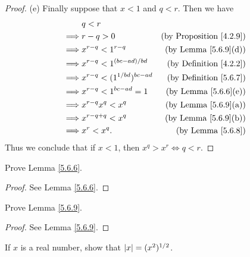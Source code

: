 \begin{proof}{(e)}
    Finally suppose that \(x < 1\) and \(q < r\).
    Then we have
    \begin{align*}
                 & q < r                                                                    \\
        \implies & r - q > 0                          & \text{(by Proposition \ref{4.2.9})} \\
        \implies & x^{r - q} < 1^{r - q}              & \text{(by Lemma \ref{5.6.9}(d))}    \\
        \implies & x^{r - q} < 1^{(bc - ad) / bd}     & \text{(by Definition \ref{4.2.2})}  \\
        \implies & x^{r - q} < (1^{1 / bd})^{bc - ad} & \text{(by Definition \ref{5.6.7})}  \\
        \implies & x^{r - q} < 1^{bc - ad} = 1        & \text{(by Lemma \ref{5.6.6}(e))}    \\
        \implies & x^{r - q} x^q < x^q                & \text{(by Lemma \ref{5.6.9}(a))}    \\
        \implies & x^{r - q + q} < x^q                & \text{(by Lemma \ref{5.6.9}(b))}    \\
        \implies & x^r < x^q.                         & \text{(by Lemma \ref{5.6.8})}
    \end{align*}
    Thus we conclude that if \(x < 1\), then \(x^q > x^r \iff q < r\).
\end{proof}

\exercisesection

\begin{exercise}\label{ex 5.6.1}
    Prove Lemma \ref{5.6.6}.
\end{exercise}

\begin{proof}
    See Lemma \ref{5.6.6}.
\end{proof}

\begin{exercise}\label{ex 5.6.2}
    Prove Lemma \ref{5.6.9}.
\end{exercise}

\begin{proof}
    See Lemma \ref{5.6.9}.
\end{proof}

\begin{exercise}\label{ex 5.6.3}
    If \(x\) is a real number, show that \(\abs*{x} = (x^2)^{1 / 2}\).
\end{exercise}

